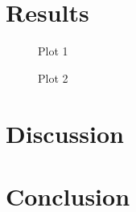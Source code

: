 \documentclass{acm_proc_article-sp}
\begin{document}
\section{Results}

\begin{figure}
\centering

\caption{Plot 1}\label{fig-eratosthenes-bender_wctime}
\end{figure}

\begin{figure}
\centering

\caption{Plot 2}\label{fig-eratosthenes-bender_vss}
\end{figure}


%
%
%


\section{Discussion}

\section{Conclusion}





\end{document}
